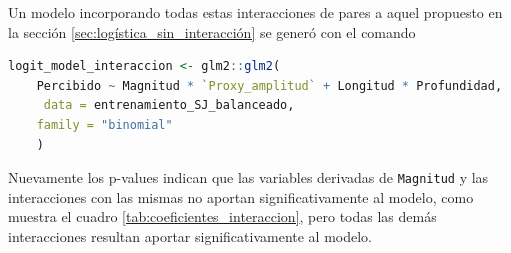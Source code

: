 \documentclass[a4paper]{report}
\begin{document}
Un modelo incorporando todas estas interacciones de pares a aquel propuesto en la sección \ref{sec:logística_sin_interacción} se generó con el comando
\begin{lstlisting}[language=R, breaklines=true]
logit_model_interaccion <- glm2::glm2(
	Percibido ~ Magnitud * `Proxy_amplitud` + Longitud * Profundidad,
	 data = entrenamiento_SJ_balanceado,
	family = "binomial"
	)
\end{lstlisting}

Nuevamente los p-values indican que las variables derivadas de \verb'Magnitud' y las interacciones con las mismas no aportan significativamente al modelo, como muestra el cuadro \ref{tab:coeficientes_interaccion}, pero todas las demás interacciones resultan aportar significativamente al modelo.

\begin{table}
	\centering
 	\caption{Estimadores de los coeficientes, \(\hat{\beta}\), del modelo de regresión logística múltiple incorporando la interacción entre variables, y sus errores.}
	\label{tab:coeficientes_interaccion}
\end{table}
\end{document}
